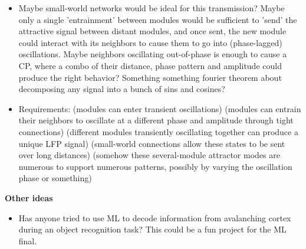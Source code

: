 \documentclass[a4paper, 12pt]{article}
\begin{document}
\begin{itemize}
\item Maybe small-world networks would be ideal for this transmission? Maybe only a single 'entrainment' between modules would be sufficient to 'send' the attractive signal between distant modules, and once sent, the new module could interact with its neighbors to cause them to go into (phase-lagged) oscillations. Maybe neighbors oscillating out-of-phase is enough to cause a CP, where a combo of their distance, phase pattern and amplitude could produce the right behavior? Something something fourier theorem about decomposing any signal into a bunch of sins and cosines?
\item Requirements: (modules can enter transient oscillations) (modules can entrain their neighbors to oscillate at a different phase and amplitude through tight connections) (different modules transiently oscillating together can produce a unique LFP signal) (small-world connections allow these states to be sent over long distances) (somehow these several-module attractor modes are numerous to support numerous patterns, possibly by varying the oscillation phase or something)
\end{itemize}

\textbf{Other ideas}
\begin{itemize}
\item Has anyone tried to use ML to decode information from avalanching cortex during an object recognition task? This could be a fun project for the ML final.
\end{itemize}



\end{document}

